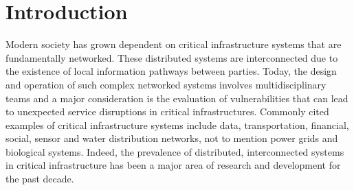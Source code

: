 \documentclass{amsart}
\theoremstyle{definition}
\theoremstyle{remark}
\numberwithin{equation}{section}
\begin{document}
\begin{abstract}
\end{abstract}

\maketitle

\section{Introduction}
Modern society has grown dependent on critical infrastructure systems that are fundamentally networked. These distributed systems are interconnected due to the existence of local information pathways between parties. Today, the design and operation of such complex networked systems involves multidisciplinary teams and a major consideration is the evaluation of vulnerabilities that can lead to unexpected service disruptions in critical infrastructures. Commonly cited examples of critical infrastructure systems include data, transportation, financial, social, sensor and water distribution networks, not to mention power grids and biological systems. Indeed, the prevalence of distributed, interconnected systems in critical infrastructure has been a major area of research and development for the past decade.    
\end{document}
